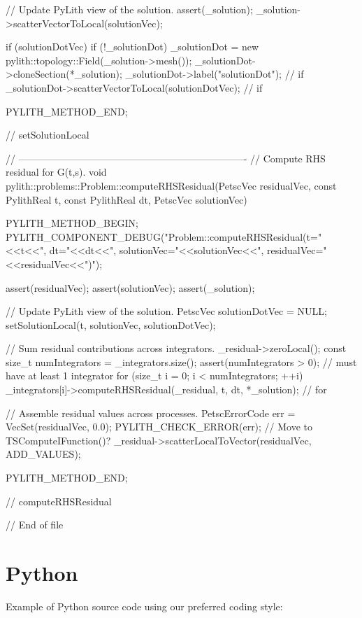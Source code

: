 \begin{cplusplus}
{    // Update PyLith view of the solution.
    assert(_solution);
    _solution->scatterVectorToLocal(solutionVec);

    if (solutionDotVec) {
        if (!_solutionDot) {
            _solutionDot = new pylith::topology::Field(_solution->mesh());
            _solutionDot->cloneSection(*_solution);
            _solutionDot->label("solutionDot");
        } // if
        _solutionDot->scatterVectorToLocal(solutionDotVec);
    } // if

    PYLITH_METHOD_END;
} // setSolutionLocal

// ----------------------------------------------------------------------
// Compute RHS residual for G(t,s).
void
pylith::problems::Problem::computeRHSResidual(PetscVec residualVec,
                                              const PylithReal t,
                                              const PylithReal dt,
                                              PetscVec solutionVec) {
    PYLITH_METHOD_BEGIN;
    PYLITH_COMPONENT_DEBUG("Problem::computeRHSResidual(t="<<t<<", dt="<<dt<<", solutionVec="<<solutionVec<<", residualVec="<<residualVec<<")");

    assert(residualVec);
    assert(solutionVec);
    assert(_solution);

    // Update PyLith view of the solution.
    PetscVec solutionDotVec = NULL;
    setSolutionLocal(t, solutionVec, solutionDotVec);

    // Sum residual contributions across integrators.
    _residual->zeroLocal();
    const size_t numIntegrators = _integrators.size();
    assert(numIntegrators > 0); // must have at least 1 integrator
    for (size_t i = 0; i < numIntegrators; ++i) {
        _integrators[i]->computeRHSResidual(_residual, t, dt, *_solution);
    } // for

    // Assemble residual values across processes.
    PetscErrorCode err = VecSet(residualVec, 0.0); PYLITH_CHECK_ERROR(err); // Move to TSComputeIFunction()?
    _residual->scatterLocalToVector(residualVec, ADD_VALUES);

    PYLITH_METHOD_END;
} // computeRHSResidual

// End of file
  
\end{cplusplus}

\section{Python}

Example of Python source code using our preferred coding style:

